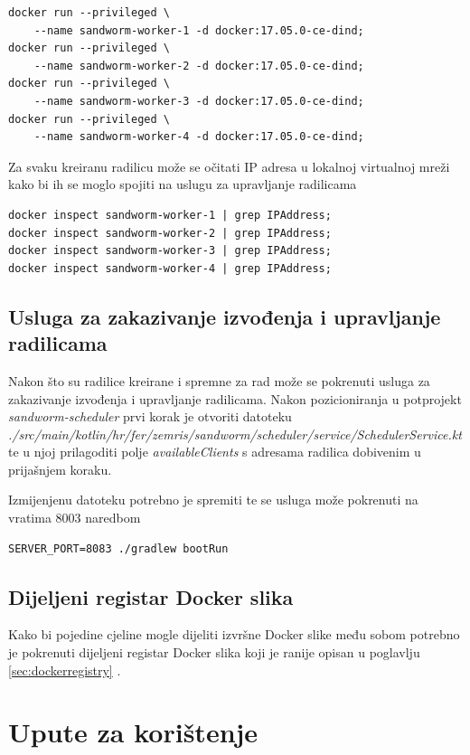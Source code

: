 \documentclass[times, utf8, zavrsni]{fer}
\begin{document}
{{{\begin{appendices}
\begin{lstlisting}
docker run --privileged \
	--name sandworm-worker-1 -d docker:17.05.0-ce-dind;
docker run --privileged \
	--name sandworm-worker-2 -d docker:17.05.0-ce-dind;
docker run --privileged \
	--name sandworm-worker-3 -d docker:17.05.0-ce-dind;
docker run --privileged \
	--name sandworm-worker-4 -d docker:17.05.0-ce-dind;
\end{lstlisting}

Za svaku kreiranu radilicu može se očitati IP adresa u lokalnoj virtualnoj mreži kako bi ih se moglo spojiti na uslugu za upravljanje radilicama

\begin{lstlisting}
docker inspect sandworm-worker-1 | grep IPAddress;
docker inspect sandworm-worker-2 | grep IPAddress;
docker inspect sandworm-worker-3 | grep IPAddress;
docker inspect sandworm-worker-4 | grep IPAddress;
\end{lstlisting}

\section{Usluga za zakazivanje izvođenja i upravljanje radilicama}

Nakon što su radilice kreirane i spremne za rad može se pokrenuti usluga za zakazivanje izvođenja i upravljanje radilicama. Nakon pozicioniranja u potprojekt {\textit{sandworm-scheduler}} prvi korak je otvoriti datoteku {\textit{./src/main/kotlin/hr/fer/zemris/sandworm/scheduler/service/SchedulerService.kt}} te u njoj prilagoditi polje {\textit{availableClients}} s adresama radilica dobivenim u prijašnjem koraku.

Izmijenjenu datoteku potrebno je spremiti te se usluga može pokrenuti na vratima 8003 naredbom

\begin{lstlisting}
SERVER_PORT=8083 ./gradlew bootRun
\end{lstlisting}

\section{Dijeljeni registar Docker slika}

Kako bi pojedine cjeline mogle dijeliti izvršne Docker slike među sobom potrebno je pokrenuti dijeljeni registar Docker slika koji je ranije opisan u poglavlju \ref{sec:dockerregistry} .

\chapter{Upute za korištenje}
\label{sec:usagemanual}


\end{appendices}}}}
\end{document}
